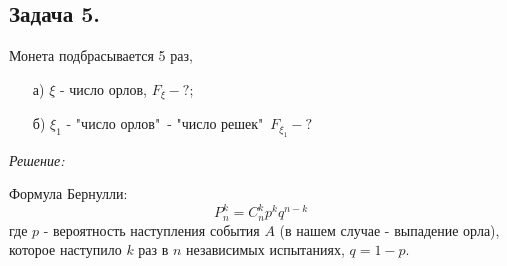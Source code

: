 \begin{figure}[H]
\end{figure}

\subsection*{Задача 5.}
Монета подбрасывается 5 раз,
\begin{enumerate}
	\item[а)] $\xi$ - число орлов, $F_{\xi} - ?$;
	\item[б)] $\xi_1$ - "число орлов"\, - "число решек"\, $F_{\xi_1} - ?$
\end{enumerate}

\noindent \textit{Решение:}

Формула Бернулли:
\[ P_n^k = C_n^k p^k q^{n-k} \]
\noindent где $p$ - вероятность наступления события $A$ (в нашем случае - выпадение орла), которое наступило $k$ раз в $n$ независимых испытаниях, $q=1-p$.

